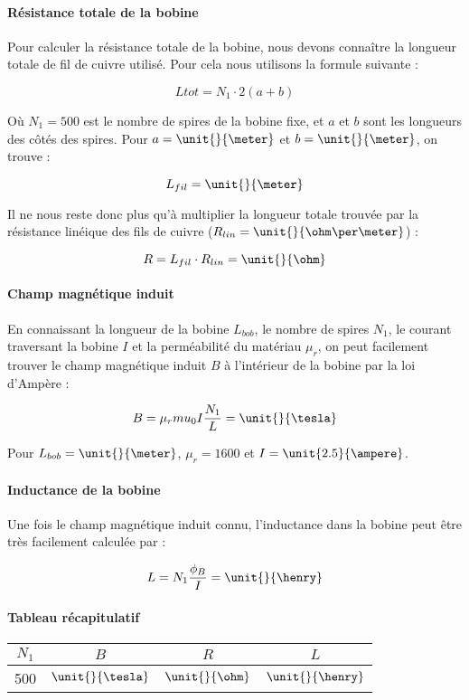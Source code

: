 \paragraph{Résistance totale de la bobine}
Pour calculer la résistance totale de la bobine, nous devons connaître la longueur totale de fil de cuivre utilisé.
Pour cela nous utilisons la formule suivante :

$$L{tot} = N_1 \cdot 2(a + b)$$

Où $N_1 = 500$ est le nombre de spires de la bobine fixe, et $a$ et $b$ sont les longueurs des côtés des spires. Pour
$a = \unit{}{\meter}$ et $b = \unit{}{\meter}$, on trouve :

$$L_{fil} = \unit{}{\meter}$$

Il ne nous reste donc plus qu'à multiplier la longueur totale trouvée par la résistance linéique des fils de cuivre
($R_{lin} = \unit{}{\ohm\per\meter}$) :

$$R = L_{fil} \cdot R_{lin} = \unit{}{\ohm}$$

\paragraph{Champ magnétique induit}
En connaissant la longueur de la bobine $L_{bob}$, le nombre de spires $N_1$, le courant traversant la bobine $I$ et
la perméabilité du matériau $\mu_r$, on peut facilement trouver le champ magnétique induit $B$ à l'intérieur de la bobine 
par la loi d'Ampère :

$$B = \mu_rmu_0I \frac{N_1}{L} = \unit{}{\tesla}$$

Pour $L_{bob} = \unit{}{\meter}$, $\mu_r = 1600$ et $I = \unit{2.5}{\ampere}$.

\paragraph{Inductance de la bobine}
Une fois le champ magnétique induit connu, l'inductance dans la bobine peut être très facilement calculée par :

$$L = N_1 \frac{\phi_B}{I} = \unit{}{\henry}$$

\paragraph{Tableau récapitulatif}

\begin{center}
	\begin{tabular}{c|c|c|c}
		$N_1$ & $B$ & $R$ & $L$ \\
		\hline
		500 & $\unit{}{\tesla}$ & $\unit{}{\ohm}$ & $\unit{}{\henry}$ \\
	\end{tabular}
\end{center}

